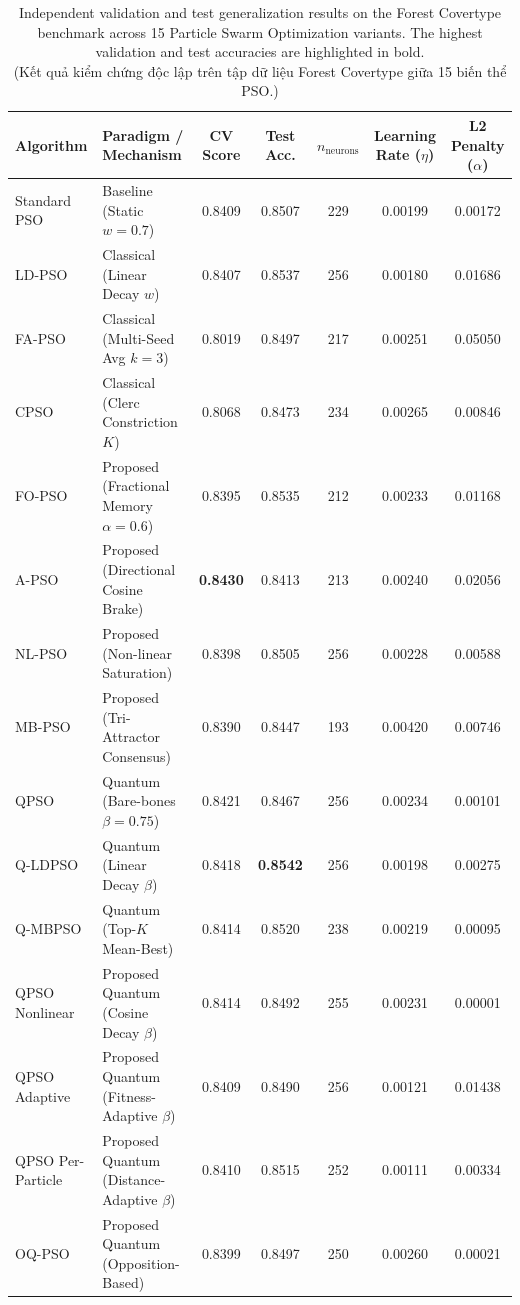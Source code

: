 \begin{table}[htbp]
\centering
\fontsize{8.5pt}{11pt}\selectfont
\caption{Independent validation and test generalization results on the Forest Covertype benchmark across 15 Particle Swarm Optimization variants. The highest validation and test accuracies are highlighted in bold. \\ (Kết quả kiểm chứng độc lập trên tập dữ liệu Forest Covertype giữa 15 biến thể PSO.)}
\label{tab:covertype_15algos}
\vspace{3pt}
\begin{tabular}{llccccc}
\hline\hline
\textbf{Algorithm} & \textbf{Paradigm / Mechanism} & \textbf{CV Score} & \textbf{Test Acc.} & \textbf{$n_{\mathrm{neurons}}$} & \textbf{Learning Rate ($\eta$)} & \textbf{L2 Penalty ($\alpha$)} \\
\hline
Standard PSO & Baseline (Static $w=0.7$) & 0.8409 & 0.8507 & 229 & 0.00199 & 0.00172 \\
LD-PSO & Classical (Linear Decay $w$) & 0.8407 & 0.8537 & 256 & 0.00180 & 0.01686 \\
FA-PSO & Classical (Multi-Seed Avg $k=3$) & 0.8019 & 0.8497 & 217 & 0.00251 & 0.05050 \\
CPSO & Classical (Clerc Constriction $K$) & 0.8068 & 0.8473 & 234 & 0.00265 & 0.00846 \\
\hline
FO-PSO & Proposed (Fractional Memory $\alpha=0.6$) & 0.8395 & 0.8535 & 212 & 0.00233 & 0.01168 \\
A-PSO & Proposed (Directional Cosine Brake) & \textbf{0.8430} & 0.8413 & 213 & 0.00240 & 0.02056 \\
NL-PSO & Proposed (Non-linear Saturation) & 0.8398 & 0.8505 & 256 & 0.00228 & 0.00588 \\
MB-PSO & Proposed (Tri-Attractor Consensus) & 0.8390 & 0.8447 & 193 & 0.00420 & 0.00746 \\
\hline
QPSO & Quantum (Bare-bones $\beta=0.75$) & 0.8421 & 0.8467 & 256 & 0.00234 & 0.00101 \\
Q-LDPSO & Quantum (Linear Decay $\beta$) & 0.8418 & \textbf{0.8542} & 256 & 0.00198 & 0.00275 \\
Q-MBPSO & Quantum (Top-$K$ Mean-Best) & 0.8414 & 0.8520 & 238 & 0.00219 & 0.00095 \\
\hline
QPSO Nonlinear & Proposed Quantum (Cosine Decay $\beta$) & 0.8414 & 0.8492 & 255 & 0.00231 & 0.00001 \\
QPSO Adaptive & Proposed Quantum (Fitness-Adaptive $\beta$) & 0.8409 & 0.8490 & 256 & 0.00121 & 0.01438 \\
QPSO Per-Particle & Proposed Quantum (Distance-Adaptive $\beta$) & 0.8410 & 0.8515 & 252 & 0.00111 & 0.00334 \\
OQ-PSO & Proposed Quantum (Opposition-Based) & 0.8399 & 0.8497 & 250 & 0.00260 & 0.00021 \\
\hline\hline
\end{tabular}
\end{table}